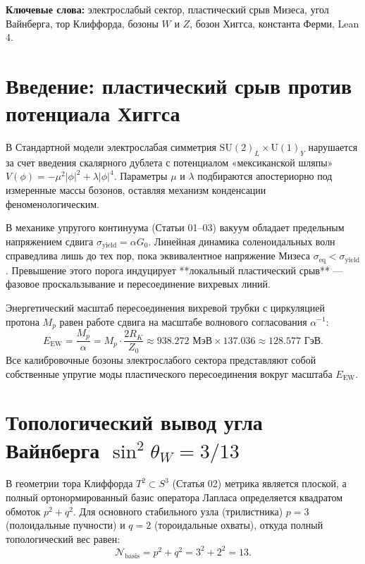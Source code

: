 \documentclass[11pt,a4paper]{article}
\theoremstyle{definition}
\theoremstyle{remark}
\begin{document}
\vspace{2mm}
\noindent\textbf{Ключевые слова:} электрослабый сектор, пластический срыв Мизеса, угол Вайнберга, тор Клиффорда, бозоны $W$ и $Z$, бозон Хиггса, константа Ферми, Lean 4.

\section{Введение: пластический срыв против потенциала Хиггса}
В Стандартной модели электрослабая симметрия $\mathrm{SU}(2)_L \times \mathrm{U}(1)_Y$ нарушается за счет введения скалярного дублета с потенциалом «мексиканской шляпы» $V(\phi) = -\mu^2 |\phi|^2 + \lambda |\phi|^4$. Параметры $\mu$ и $\lambda$ подбираются апостериорно под измеренные массы бозонов, оставляя механизм конденсации феноменологическим.

В механике упругого континуума (Статьи 01--03) вакуум обладает предельным напряжением сдвига $\sigma_{\mathrm{yield}} = \alpha G_0$. Линейная динамика соленоидальных волн справедлива лишь до тех пор, пока эквивалентное напряжение Мизеса $\sigma_{\mathrm{eq}} < \sigma_{\mathrm{yield}}$. Превышение этого порога индуцирует **локальный пластический срыв** — фазовое проскальзывание и пересоединение вихревых линий.

Энергетический масштаб пересоединения вихревой трубки с циркуляцией протона $M_p$ равен работе сдвига на масштабе волнового согласования $\alpha^{-1}$:
\begin{equation}
    E_{\mathrm{EW}} = \frac{M_p}{\alpha} = M_p \cdot \frac{2 R_K}{Z_0} \approx 938.272\text{ МэВ} \times 137.036 \approx \mathbf{128.577\text{ ГэВ}}.
\end{equation}
Все калибровочные бозоны электрослабого сектора представляют собой собственные упругие моды пластического пересоединения вокруг масштаба $E_{\mathrm{EW}}$.

\section{Топологический вывод угла Вайнберга $\sin^2\theta_W = 3/13$}
В геометрии тора Клиффорда $T^2 \subset S^3$ (Статья 02) метрика является плоской, а полный ортонормированный базис оператора Лапласа определяется квадратом обмоток $p^2 + q^2$. Для основного стабильного узла (трилистника) $p=3$ (полоидальные пучности) и $q=2$ (тороидальные охваты), откуда полный топологический вес равен:
\begin{equation}
    \mathcal{N}_{\mathrm{basis}} = p^2 + q^2 = 3^2 + 2^2 = 13.
\end{equation}
\end{document}

